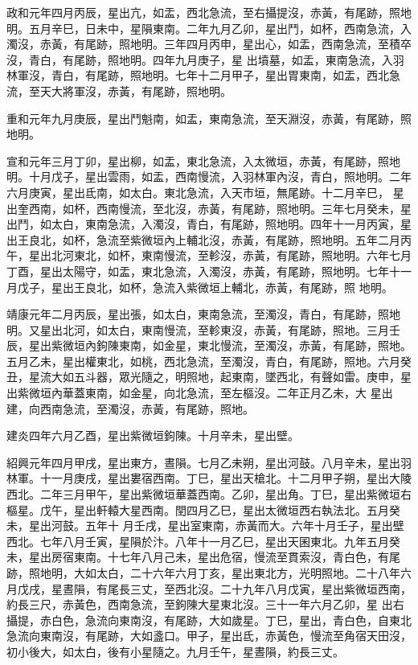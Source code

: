 \begin{pinyinscope}
 政和元年四月丙辰，星出亢，如盂，西北急流，至右攝提沒，赤黃，有尾跡，照地明。五月辛巳，日未中，星隕東南。二年九月乙卯，星出鬥，如杯，西南急流，入濁沒，赤黃，有尾跡，照地明。三年四月丙申，星出心，如盂，西南急流，至積卒沒，青白，有尾跡，照地明。四年九月庚子，星
 出墳墓，如盂，東南急流，入羽林軍沒，青白，有尾跡，照地明。七年十二月甲子，星出胃東南，如盂，西北急流，至天大將軍沒，赤黃，有尾跡，照地明。



 重和元年九月庚辰，星出鬥魁南，如盂，東南急流，至天淵沒，赤黃，有尾跡，照地明。



 宣和元年三月丁卯，星出柳，如盂，東北急流，入太微垣，赤黃，有尾跡，照地明。十月戊子，星出雲雨，如盂，西南慢流，入羽林軍內沒，青白，照地明。二年六月庚寅，星出氐南，如太白。東北急流，入天市垣，無尾跡。十二月辛巳，
 星出奎西南，如杯，西南慢流，至北沒，赤黃，有尾跡，照地明。三年七月癸未，星出鬥，如太白，東南急流，入濁沒，青白，有尾跡，照地明。四年十一月丙寅，星出王良北，如杯，急流至紫微垣內上輔北沒，赤黃，有尾跡，照地明。五年二月丙午，星出北河東北，如杯，東南慢流，至軫沒，赤黃，有尾跡，照地明。六年七月丁酉，星出太陽守，如盂，東北急流，入濁沒，赤黃，有尾跡，照地明。七年十一月戊子，星出王良北，如杯，急流入紫微垣上輔北，赤黃，有尾跡，照
 地明。



 靖康元年二月丙辰，星出張，如太白，東南急流，至濁沒，青白，有尾跡，照地明。又星出北河，如太白，東南慢流，至軫東沒，赤黃，有尾跡，照地。三月壬辰，星出紫微垣內鉤陳東南，如金星，東北慢流，至濁沒，赤黃，有尾跡，照地。五月乙未，星出權東北，如桃，西北急流，至濁沒，青白，有尾跡，照地。六月癸丑，星流大如五斗器，眾光隨之，明照地，起東南，墜西北，有聲如雷。庚申，星出紫微垣內華蓋東南，如金星，向北急流，至左樞沒。二年正月乙未，大
 星出建，向西南急流，至濁沒，赤黃，有尾跡，照地。



 建炎四年六月乙酉，星出紫微垣鉤陳。十月辛未，星出壁。



 紹興元年四月甲戌，星出東方，晝隕。七月乙未朔，星出河鼓。八月辛未，星出羽林軍。十一月庚戌，星出婁宿西南。丁巳，星出天槍北。十二月甲子朔，星出大陵西北。二年三月甲午，星出紫微垣華蓋西南。乙卯，星出角。丁巳，星出紫微垣右樞星。戊午，星出軒轅大星西南。閏四月乙巳，星出太微垣西右執法北。五月癸未，星出河鼓。五年十
 月壬戌，星出室東南，赤黃而大。六年十月壬子，星出壁西北。七年八月壬寅，星隕於汴。八年十一月乙巳，星出天囷東北。九年五月癸未，星出房宿東南。十七年八月己未，星出危宿，慢流至貫索沒，青白色，有尾跡，照地明，大如太白，二十六年六月丁亥，星出東北方，光明照地。二十八年六月戊戌，星晝隕，有尾長三丈，至西北沒。二十九年八月戊寅，星出紫微垣西南，約長三尺，赤黃色，西南急流，至鉤陳大星東北沒。三十一年六月乙卯，星
 出右攝提，赤白色，急流向東南沒，有尾跡，大如歲星。丁巳，星出，青白色，自東北急流向東南沒，有尾跡，大如盞口。甲子，星出氐，赤黃色，慢流至角宿天田沒，初小後大，如太白，後有小星隨之。九月壬午，星晝隕，約長三丈。




\end{pinyinscope}
